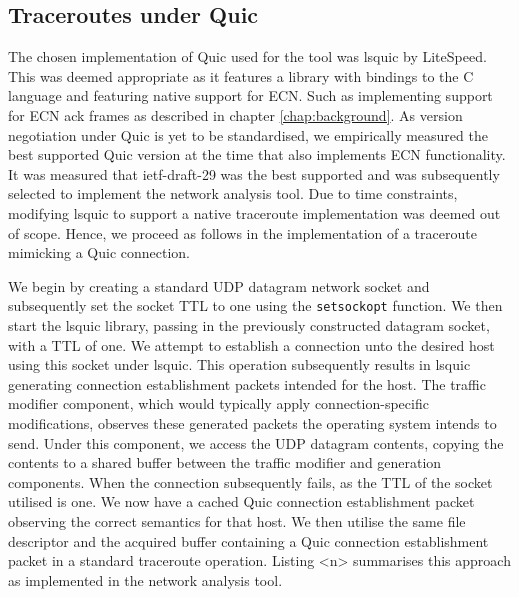 \documentclass{l4proj}
\begin{document}
\subsection{Traceroutes under Quic}


The chosen implementation of Quic used for the tool was lsquic by LiteSpeed. This was deemed appropriate as it features a library with bindings to the C language and featuring native support for ECN. Such as implementing support for ECN ack frames as described in chapter \ref{chap:background}. As version negotiation under Quic is yet to be standardised, we empirically measured the best supported Quic version at the time that also implements ECN functionality. It was measured that ietf-draft-29 was the best supported and was subsequently selected to implement the network analysis tool. Due to time constraints, modifying lsquic to support a native traceroute implementation was deemed out of scope. Hence, we proceed as follows in the implementation of a traceroute mimicking a Quic connection.

We begin by creating a standard UDP datagram network socket and subsequently set the socket TTL to one using the \lstinline{setsockopt} function. We then start the lsquic library, passing in the previously constructed datagram socket, with a TTL of one. We attempt to establish a connection unto the desired host using this socket under lsquic. This operation subsequently results in lsquic generating connection establishment packets intended for the host. The traffic modifier component, which would typically apply connection-specific modifications, observes these generated packets the operating system intends to send. Under this component, we access the UDP datagram contents, copying the contents to a shared buffer between the traffic modifier and generation components. When the connection subsequently fails, as the TTL of the socket utilised is one. We now have a cached Quic connection establishment packet observing the correct semantics for that host. We then utilise the same file descriptor and the acquired buffer containing a Quic connection establishment packet in a standard traceroute operation. Listing <n> summarises this approach as implemented in the network analysis tool.
\end{document}

